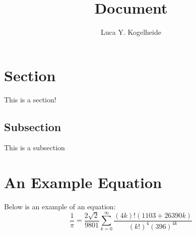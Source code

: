 \documentclass[a4paper,12pt]{article}
\title{Document}
\author{Luca Y. Kogelheide}
\begin{document}
\maketitle
\tableofcontents
\newpage
\section{Section}
This is a section!
\subsection{Subsection}
This is a subsection
\section{An Example Equation}
Below is an example of an equation:
\[ \frac{1}{\pi} = \frac{2\sqrt{2}}{9801} \sum_{k=0}^\infty 
  \frac{(4k)!(1103 + 26390k)}{(k!)^4 (396)^{4k}} \]
\newpage
\end{document}
